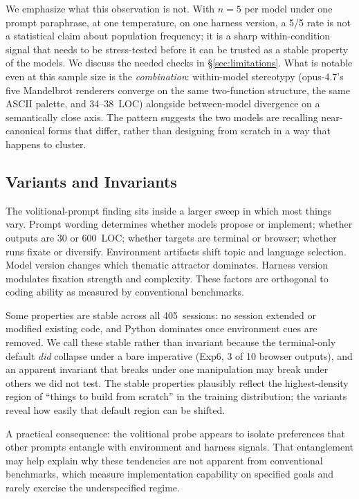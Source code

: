 \documentclass{article}
\begin{document}
We emphasize what this observation is not. With $n=5$ per
model under one prompt paraphrase, at one temperature, on one
harness version, a 5/5 rate is not a statistical claim about
population frequency; it is a sharp within-condition signal
that needs to be stress-tested before it can be trusted as a
stable property of the models. We discuss the needed checks
in \S\ref{sec:limitations}. What is notable even at this
sample size is the \emph{combination}: within-model
stereotypy (opus-4.7's five Mandelbrot renderers converge on
the same two-function structure, the same ASCII palette, and
34--38~LOC) alongside between-model divergence on a
semantically close axis. The pattern suggests the two models
are recalling near-canonical forms that differ, rather than
designing from scratch in a way that happens to cluster.

\subsection{Variants and Invariants}

The volitional-prompt finding sits inside a larger sweep in
which most things vary. Prompt wording determines whether
models propose or implement; whether outputs are 30 or
600~LOC; whether targets are terminal or browser; whether
runs fixate or diversify. Environment artifacts shift topic
and language selection. Model version changes which
thematic attractor dominates. Harness version modulates
fixation strength and complexity. These factors are
orthogonal to coding ability as measured by conventional
benchmarks.

Some properties are stable across all 405~sessions: no
session extended or modified existing code, and Python
dominates once environment cues are removed. We call these
stable rather than invariant because the terminal-only
default \emph{did} collapse under a bare imperative (Exp6,
3 of 10 browser outputs), and an apparent invariant that
breaks under one manipulation may break under others we did
not test. The stable properties plausibly reflect the
highest-density region of ``things to build from scratch'' in
the training distribution; the variants reveal how easily
that default region can be shifted.

A practical consequence: the volitional probe appears to
isolate preferences that other prompts entangle with
environment and harness signals. That entanglement may help
explain why these tendencies are not apparent from
conventional benchmarks, which measure implementation
capability on specified goals and rarely exercise the
underspecified regime.
\end{document}
